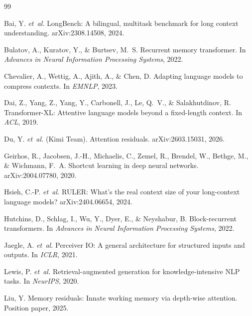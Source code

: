 \documentclass[11pt]{article}
\begin{document}
\begin{thebibliography}{99}

Bai, Y. \emph{et~al.}
\newblock LongBench: A bilingual, multitask benchmark for long context understanding.
\newblock arXiv:2308.14508, 2024.

Bulatov, A., Kuratov, Y., \& Burtsev, M.~S.
\newblock Recurrent memory transformer.
\newblock In \emph{Advances in Neural Information Processing Systems}, 2022.

Chevalier, A., Wettig, A., Ajith, A., \& Chen, D.
\newblock Adapting language models to compress contexts.
\newblock In \emph{EMNLP}, 2023.

Dai, Z., Yang, Z., Yang, Y., Carbonell, J., Le, Q.~V., \& Salakhutdinov, R.
\newblock Transformer-XL: Attentive language models beyond a fixed-length context.
\newblock In \emph{ACL}, 2019.

Du, Y. \emph{et~al.} (Kimi Team).
\newblock Attention residuals.
\newblock arXiv:2603.15031, 2026.

Geirhos, R., Jacobsen, J.-H., Michaelis, C., Zemel, R., Brendel, W.,
  Bethge, M., \& Wichmann, F.~A.
\newblock Shortcut learning in deep neural networks.
\newblock arXiv:2004.07780, 2020.

Hsieh, C.-P. \emph{et~al.}
\newblock RULER: What's the real context size of your long-context language models?
\newblock arXiv:2404.06654, 2024.

Hutchins, D., Schlag, I., Wu, Y., Dyer, E., \& Neyshabur, B.
\newblock Block-recurrent transformers.
\newblock In \emph{Advances in Neural Information Processing Systems}, 2022.

Jaegle, A. \emph{et~al.}
\newblock Perceiver IO: A general architecture for structured inputs and outputs.
\newblock In \emph{ICLR}, 2021.

Lewis, P. \emph{et~al.}
\newblock Retrieval-augmented generation for knowledge-intensive NLP tasks.
\newblock In \emph{NeurIPS}, 2020.

Liu, Y.
\newblock Memory residuals: Innate working memory via depth-wise attention.
\newblock Position paper, 2025.


\end{thebibliography}
\end{document}
